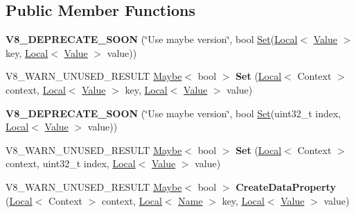 \subsection*{Public Member Functions}
\begin{DoxyCompactItemize}
\item 
\mbox{\label{classv8_1_1Object_a86333122230b703cabfb08d8a7d54a58}} 
{\bfseries V8\+\_\+\+D\+E\+P\+R\+E\+C\+A\+T\+E\+\_\+\+S\+O\+ON} (\char`\"{}Use maybe version\char`\"{}, bool \mbox{\hyperlink{classv8_1_1Set}{Set}}(\mbox{\hyperlink{classv8_1_1Local}{Local}}$<$ \mbox{\hyperlink{classv8_1_1Value}{Value}} $>$ key, \mbox{\hyperlink{classv8_1_1Local}{Local}}$<$ \mbox{\hyperlink{classv8_1_1Value}{Value}} $>$ value))
\item 
\mbox{\label{classv8_1_1Object_ac5840fc655bea7b2b55a4b49338360ae}} 
V8\+\_\+\+W\+A\+R\+N\+\_\+\+U\+N\+U\+S\+E\+D\+\_\+\+R\+E\+S\+U\+LT \mbox{\hyperlink{classv8_1_1Maybe}{Maybe}}$<$ bool $>$ {\bfseries Set} (\mbox{\hyperlink{classv8_1_1Local}{Local}}$<$ Context $>$ context, \mbox{\hyperlink{classv8_1_1Local}{Local}}$<$ \mbox{\hyperlink{classv8_1_1Value}{Value}} $>$ key, \mbox{\hyperlink{classv8_1_1Local}{Local}}$<$ \mbox{\hyperlink{classv8_1_1Value}{Value}} $>$ value)
\item 
\mbox{\label{classv8_1_1Object_a0c2305335e71c88d245dd1aa0060a2de}} 
{\bfseries V8\+\_\+\+D\+E\+P\+R\+E\+C\+A\+T\+E\+\_\+\+S\+O\+ON} (\char`\"{}Use maybe version\char`\"{}, bool \mbox{\hyperlink{classv8_1_1Set}{Set}}(uint32\+\_\+t index, \mbox{\hyperlink{classv8_1_1Local}{Local}}$<$ \mbox{\hyperlink{classv8_1_1Value}{Value}} $>$ value))
\item 
\mbox{\label{classv8_1_1Object_ace0cbcf5659a82106601d07b3e6fa2be}} 
V8\+\_\+\+W\+A\+R\+N\+\_\+\+U\+N\+U\+S\+E\+D\+\_\+\+R\+E\+S\+U\+LT \mbox{\hyperlink{classv8_1_1Maybe}{Maybe}}$<$ bool $>$ {\bfseries Set} (\mbox{\hyperlink{classv8_1_1Local}{Local}}$<$ Context $>$ context, uint32\+\_\+t index, \mbox{\hyperlink{classv8_1_1Local}{Local}}$<$ \mbox{\hyperlink{classv8_1_1Value}{Value}} $>$ value)
\item 
\mbox{\label{classv8_1_1Object_ae334696b1e57ea2b333c4da48dd37895}} 
V8\+\_\+\+W\+A\+R\+N\+\_\+\+U\+N\+U\+S\+E\+D\+\_\+\+R\+E\+S\+U\+LT \mbox{\hyperlink{classv8_1_1Maybe}{Maybe}}$<$ bool $>$ {\bfseries Create\+Data\+Property} (\mbox{\hyperlink{classv8_1_1Local}{Local}}$<$ Context $>$ context, \mbox{\hyperlink{classv8_1_1Local}{Local}}$<$ \mbox{\hyperlink{classv8_1_1Name}{Name}} $>$ key, \mbox{\hyperlink{classv8_1_1Local}{Local}}$<$ \mbox{\hyperlink{classv8_1_1Value}{Value}} $>$ value)

\end{DoxyCompactItemize}
